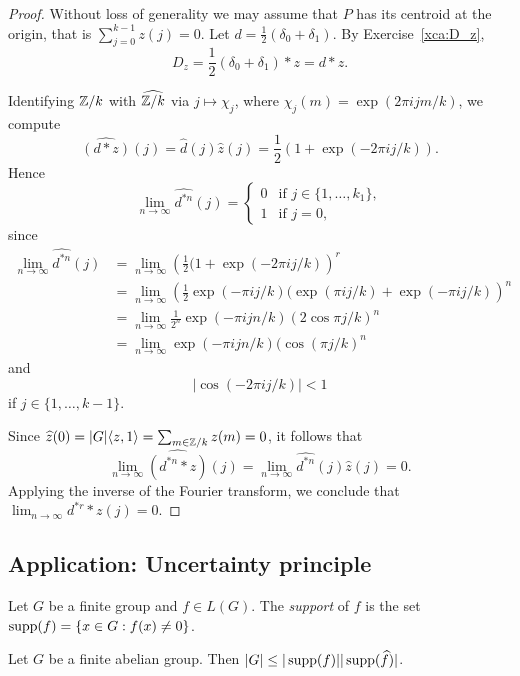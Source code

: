   \begin{proof}
    Without loss of generality we may assume that
    $P$ has its centroid at the origin, that is $\sum_{j=0}^{k-1}z(j)=0$.  Let
    $d=\frac12(\delta_0+\delta_1)$. By Exercise~\ref{xca:D_z}, 
    \[
      D_z=\frac{1}{2}(\delta_0+\delta_1)*z=d*z. 
    \]
    
    Identifying $\mathbb{Z}/k$ with 
    $\widehat{\mathbb{Z}/k}$ via $j\mapsto\chi_j$, where 
    $\chi_j(m)=\exp(2\pi ijm/k)$,
    we compute 
    \[
      \widehat{(d*z)}(j)=\widehat{d}(j)\widehat{z}(j)=\frac{1}{2}(1+\exp(-2\pi ij/k)).
    \]
    Hence  
    \[
      \lim_{n\to\infty}\widehat{d^{*n}}(j)=\begin{cases}
	0 & \text{if $j\in\{1,\dots,k_1\}$},\\
	1 & \text{if $j=0$},
      \end{cases}
    \]
    since  
    \begin{align*}
      \lim_{n\to\infty}\widehat{d^{*n}}(j)
      &=\lim_{n\to\infty}\left(\frac12(1+\exp(-2\pi ij/k)\right)^r\\
      &=\lim_{n\to\infty}\left(\frac12\exp(-\pi ij/k)(\exp(\pi ij/k)+\exp(-\pi ij/k)\right)^n\\
      &=\lim_{n\to\infty}\frac{1}{2^n}\exp(-\pi ijn/k)(2\cos\pi j/k)^n\\
      &=\lim_{n\to\infty}\exp(-\pi ijn/k)(\cos (\pi j/k)^n
    \end{align*}
    and 
    \[
    |\cos(-2\pi ij/k)|<1
    \]
    if $j\in\{1,\dots,k-1\}$. 

    Since $\widehat{z}(0)=|G|\langle z,1\rangle=\sum_{m\in\mathbb{Z}/k}z(m)=0$, it follows that
    \[
	\lim_{n\to\infty}\widehat{(d^{*n}*z)}(j)=\lim_{n\to\infty}\widehat{d^{*n}}(j)\widehat{z}(j)=0.
    \]
    Applying the inverse of the Fourier transform, we conclude 
    that $\lim_{n\to\infty}d^{*r}*z(j)=0$. 
  \end{proof}

\subsection{Application: Uncertainty principle}

\begin{definition}
  Let $G$ be a finite group and $f\in L(G)$. The \emph{support} of 
  $f$ is the set $\operatorname{supp}(f)=\{x\in G:f(x)\ne0\}$. 
\end{definition}

\begin{theorem}
  Let $G$ be a finite abelian group. Then 
  $|G|\leq|\operatorname{supp}(f)||\operatorname{supp}(\widehat{f})|$.
\end{theorem}

